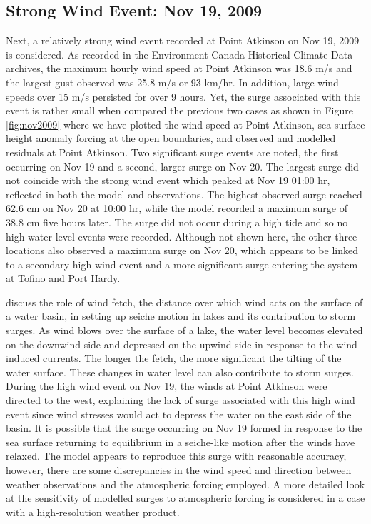 \documentclass[pdftex,10pt]{article}
\begin{document}
\subsection{Strong Wind Event: Nov 19, 2009}
Next, a relatively strong wind event recorded at Point Atkinson on Nov 19, 2009 is considered. As recorded in the Environment Canada Historical Climate Data archives, the maximum hourly wind speed at Point Atkinson was 18.6 m/s and the largest gust observed was 25.8 m/s or 93 km/hr. In addition, large wind speeds over 15 m/s persisted for over 9 hours. Yet, the surge associated with this event is rather small when compared the previous two cases as shown in Figure \ref{fig:nov2009} where we have plotted the wind speed at Point Atkinson, sea surface height anomaly forcing at the open boundaries, and observed and modelled residuals at Point Atkinson. Two significant surge events are noted, the first occurring on Nov 19 and a second, larger surge on Nov 20. The largest surge did not coincide with the strong wind event which peaked at Nov 19 01:00 hr, reflected in both the model and observations. The highest observed surge reached 62.6 cm on Nov 20 at 10:00 hr, while the model recorded a maximum surge of 38.8 cm five hours later. The surge did not occur during a high tide and so no high water level events were recorded. Although not shown here, the other three locations also observed a maximum surge on Nov 20, which appears to be linked to a secondary high wind event and a more significant surge entering the system at Tofino and Port Hardy. 

\citet{danard2003storm} discuss the role of wind fetch, the distance over which wind acts on the surface of a water basin, in setting up seiche motion in lakes and its contribution to storm surges. As wind blows over the surface of a lake, the water level becomes elevated on the downwind side and depressed on the upwind side in response to the wind-induced currents. The longer the fetch, the more significant the tilting of the water surface. These changes in water level can also contribute to storm surges.  During the high wind event on Nov 19, the winds at Point Atkinson were directed to the west, explaining the lack of surge associated with this high wind event since wind stresses would act to depress the water on the east side of the basin. It is possible that the surge occurring on Nov 19 formed in response to the sea surface returning to equilibrium in a seiche-like motion after the winds have relaxed. The model appears to reproduce this surge with reasonable accuracy, however, there are some discrepancies in the wind speed and direction between weather observations and the atmospheric forcing employed. A more detailed look at the sensitivity of modelled surges to atmospheric forcing is considered in a case with a high-resolution weather product. 
\end{document}
